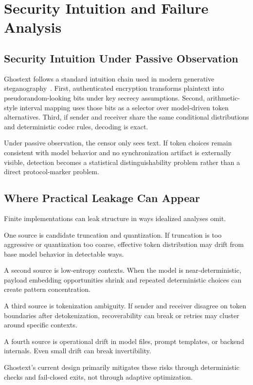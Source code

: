 \section{Security Intuition and Failure Analysis}

\subsection{Security Intuition Under Passive Observation}

Ghostext follows a standard intuition chain used in modern generative steganography~\cite{ziegler2019neural,shen2020near}. First, authenticated encryption transforms plaintext into pseudorandom-looking bits under key secrecy assumptions. Second, arithmetic-style interval mapping uses those bits as a selector over model-driven token alternatives. Third, if sender and receiver share the same conditional distributions and deterministic codec rules, decoding is exact.

Under passive observation, the censor only sees text. If token choices remain consistent with model behavior and no synchronization artifact is externally visible, detection becomes a statistical distinguishability problem rather than a direct protocol-marker problem.

\subsection{Where Practical Leakage Can Appear}

Finite implementations can leak structure in ways idealized analyses omit.

One source is candidate truncation and quantization. If truncation is too aggressive or quantization too coarse, effective token distribution may drift from base model behavior in detectable ways.

A second source is low-entropy contexts. When the model is near-deterministic, payload embedding opportunities shrink and repeated deterministic choices can create pattern concentration.

A third source is tokenization ambiguity. If sender and receiver disagree on token boundaries after detokenization, recoverability can break or retries may cluster around specific contexts.

A fourth source is operational drift in model files, prompt templates, or backend internals. Even small drift can break invertibility.

Ghostext's current design primarily mitigates these risks through deterministic checks and fail-closed exits, not through adaptive optimization.

